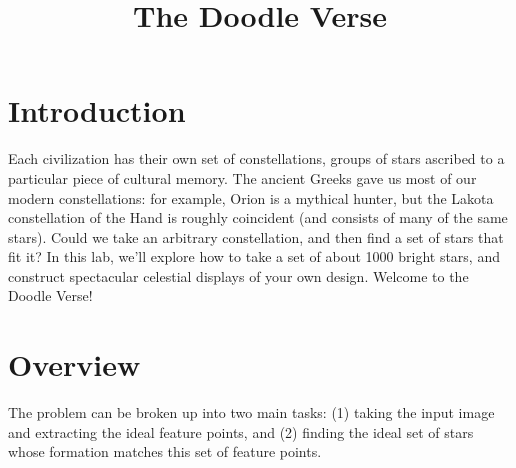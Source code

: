 \documentclass[paper=a4, fontsize=11pt]{scrartcl} %
\title{
\normalfont \normalsize
\huge The Doodle Verse \\ %
}
\date{}
\begin{document}
\maketitle

\begin{figure}[!h]
\captionsetup{labelformat=empty}
\caption{}
\end{figure}

\section{Introduction}

Each civilization has their own set of constellations, groups of stars ascribed to a particular piece of cultural
memory. The ancient Greeks gave us most of our modern constellations: for example, Orion is a mythical
hunter, but the Lakota constellation of the Hand is roughly coincident (and consists of many of the same
stars). Could we take an arbitrary constellation, and then find a set of stars that fit it? In this lab, we’ll
explore how to take a set of about 1000 bright stars, and construct spectacular celestial displays of your own
design. Welcome to the Doodle Verse!

\section{Overview}

The problem can be broken up into two main tasks: (1) taking the input image and extracting the ideal feature points, and (2) finding the ideal set of stars whose formation matches this set of feature points.
\end{document}
